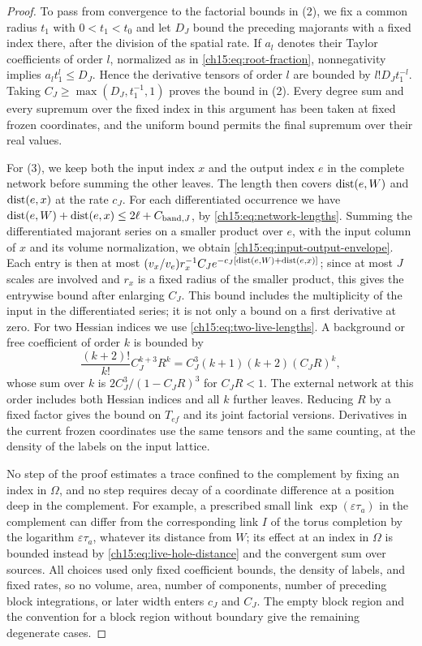\begin{proof}
To pass from convergence to the factorial bounds in (2), we fix a common radius $t_1$ with $0<t_1<t_0$ and let $D_J$ bound the preceding majorants with a fixed index there, after the division of the spatial rate. If $a_l$ denotes their Taylor coefficients of order $l$, normalized as in \eqref{ch15:eq:root-fraction}, nonnegativity implies $a_lt_1^l\le D_J$. Hence the derivative tensors of order $l$ are bounded by $l!D_Jt_1^{-l}$. Taking $C_J\ge\max(D_J,t_1^{-1},1)$ proves the bound in (2). Every degree sum and every supremum over the fixed index in this argument has been taken at fixed frozen coordinates, and the uniform bound permits the final supremum over their real values.

For (3), we keep both the input index $x$ and the output index $e$ in the complete network before summing the other leaves. The length then covers $\operatorname{dist}(e,W)$ and $\operatorname{dist}(e,x)$ at the rate $c_J$. For each differentiated occurrence we have $\operatorname{dist}(e,W)+\operatorname{dist}(e,x)\le2\ell+C_{\mathrm{band},J}$, by \eqref{ch15:eq:network-lengths}. Summing the differentiated majorant series on a smaller product over $e$, with the input column of $x$ and its volume normalization, we obtain \eqref{ch15:eq:input-output-envelope}. Each entry is then at most $(v_x/v_e)r_x^{-1}C_Je^{-c_J[\operatorname{dist}(e,W)+\operatorname{dist}(e,x)]}$; since at most $J$ scales are involved and $r_x$ is a fixed radius of the smaller product, this gives the entrywise bound after enlarging $C_J$. This bound includes the multiplicity of the input in the differentiated series; it is not only a bound on a first derivative at zero. For two Hessian indices we use \eqref{ch15:eq:two-live-lengths}. A background or free coefficient of order $k$ is bounded by
\[
 \frac{(k+2)!}{k!}C_J^{k+3}R^k
       =C_J^3(k+1)(k+2)(C_JR)^k ,
\]
whose sum over $k$ is $2C_J^3/(1-C_JR)^3$ for $C_JR<1$. The external network at this order includes both Hessian indices and all $k$ further leaves. Reducing $R$ by a fixed factor gives the bound on $T_{ef}$ and its joint factorial versions. Derivatives in the current frozen coordinates use the same tensors and the same counting, at the density of the labels on the input lattice.

No step of the proof estimates a trace confined to the complement by fixing an index in $\Omega$, and no step requires decay of a coordinate difference at a position deep in the complement. For example, a prescribed small link $\exp(\varepsilon\tau_a)$ in the complement can differ from the corresponding link $I$ of the torus completion by the logarithm $\varepsilon\tau_a$, whatever its distance from $W$; its effect at an index in $\Omega$ is bounded instead by \eqref{ch15:eq:live-hole-distance} and the convergent sum over sources. All choices used only fixed coefficient bounds, the density of labels, and fixed rates, so no volume, area, number of components, number of preceding block integrations, or later width enters $c_J$ and $C_J$. The empty block region and the convention for a block region without boundary give the remaining degenerate cases.
\end{proof}
